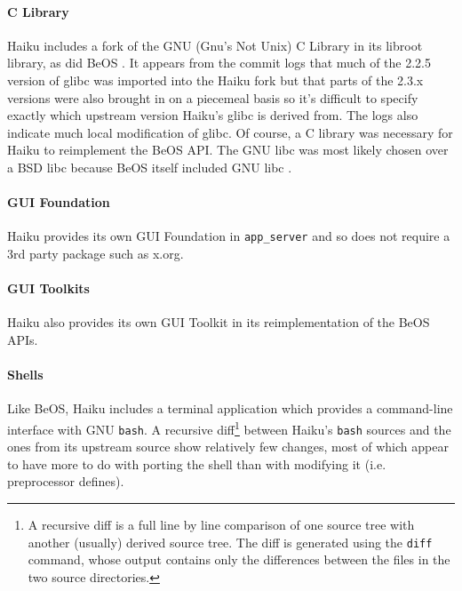 \documentclass{article}
\begin{document}
\paragraph{C Library}
Haiku includes a fork of the GNU (Gnu's Not Unix) C Library in its
libroot library, as did BeOS \cite{GlibCWiki}.  It appears from the
commit logs that much of the 2.2.5 version of glibc was imported into
the Haiku fork
\cite{HaikuLibrootGlibcOld} but that parts of the 2.3.x versions were
also brought in on a piecemeal basis \cite{HaikuLibrootGlibcRecent} so
it's difficult to specify exactly which upstream version Haiku's glibc
is derived from.  The logs also indicate much local modification of
glibc.  Of course, a C library was necessary for Haiku to reimplement
the BeOS API.  The GNU libc was most likely chosen over a BSD libc
because BeOS itself included GNU libc \cite{GlibCWiki}.

\paragraph{GUI Foundation}
Haiku provides its own GUI Foundation in \texttt{app\_server} and so
does not require a 3rd party package such as x.org.

\paragraph{GUI Toolkits}
Haiku also provides its own GUI Toolkit in its reimplementation of the
BeOS APIs.

\paragraph{Shells}
Like BeOS, Haiku includes a terminal application which provides a
command-line interface with GNU \texttt{bash}.  A recursive
diff\footnote{A recursive diff is a full line by line comparison of
one source tree with another (usually) derived source tree.  The diff
is generated using the \texttt{diff} command, whose output contains
only the differences between the files in the two source directories.}
between Haiku's \texttt{bash} sources and the ones from its upstream
source show relatively few changes, most of which appear to have more
to do with porting the shell than with modifying it (i.e. preprocessor
defines).
\end{document}

